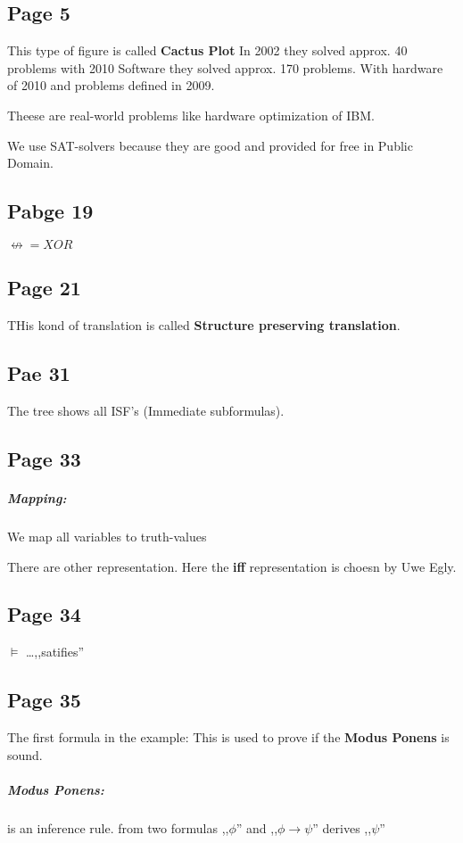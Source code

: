 \documentclass[a4paper]{article}
\newcommand{\tb}[1]{\textbf{#1}}
\begin{document}
\subsection{Page 5}
This type of figure is called \tb{Cactus Plot}
In 2002 they solved approx. 40 problems with 2010 Software they solved approx.
170 problems. With hardware of 2010 and problems defined in 2009.

Theese are real-world problems like hardware optimization of IBM.

We use SAT-solvers because they are good and provided for free in Public Domain.


\subsection{Pabge 19}

$ \not\leftrightarrow = XOR$

\subsection{Page 21}
THis kond of translation is called \tb{Structure preserving translation}.

\subsection{Pae 31}
The tree shows all ISF's (Immediate subformulas).


\subsection{Page 33}
\subparagraph{Mapping:} We map all variables to truth-values

There are other representation. Here the \tb{iff} representation is choesn by
Uwe Egly.

\subsection{Page 34}
$\models$ \ldots ,,satifies''

\subsection{Page 35}
The first formula in the example: This is used to prove if the \tb{Modus Ponens}
is sound.

\subparagraph{Modus Ponens:} is an inference rule. from two formulas ,,$\phi$''
and ,,$\phi \rightarrow \psi$'' derives ,,$\psi$''
\end{document}
